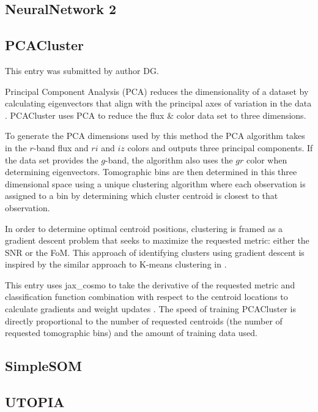 \documentclass[twocolumn,twocolappendix]{aastex63}
\begin{document}
\subsection{ {\sc NeuralNetwork 2} }


\subsection{ {\sc PCACluster} }
This entry was submitted by author DG.

Principal Component Analysis (PCA) reduces the dimensionality of a dataset by
calculating eigenvectors that align with the principal axes of variation in the
data \citep{doi:10.1098}. {\sc PCACluster} uses PCA to reduce the flux \& color
data set to three dimensions. 

To generate the PCA dimensions used by this method the PCA algorithm takes in
the $r$-band flux and $ri$ and $iz$ colors and outputs three principal
components.  If the data set provides the $g$-band, the algorithm also uses the
$gr$ color when determining eigenvectors. Tomographic bins are then determined
in this three dimensional space using a unique clustering algorithm where each
observation is assigned to a bin by determining which cluster centroid is
closest to that observation.

In order to determine optimal centroid positions, clustering is framed as a
gradient descent problem that seeks to maximize the requested metric: either the
SNR or the FoM. This approach of identifying clusters using gradient descent is
inspired by the similar approach to K-means clustering in
\cite{NIPS1994_a1140a3d}.

This entry uses {\sc jax\_cosmo} to take the derivative of the requested metric
and classification function combination with respect to the centroid locations
to calculate gradients and weight updates \citep{jax-cosmo}.  The speed of
training PCACluster is directly proportional to the number of requested
centroids (the number of requested tomographic bins) and the amount of training
data used.


\subsection{ {\sc SimpleSOM} }


\subsection{ {\sc UTOPIA} }
\end{document}
